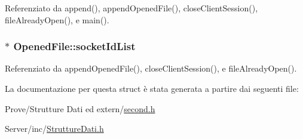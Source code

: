 Referenziato da append(), append\+Opened\+File(), close\+Client\+Session(), file\+Already\+Open(), e main().

\hypertarget{structOpenedFile_afae954d6877e7a6345a696d29355f29e}{}
\subsubsection[{socket\+Id\+List}]{$\ast$ Opened\+File\+::socket\+Id\+List}\label{structOpenedFile_afae954d6877e7a6345a696d29355f29e}


Referenziato da append\+Opened\+File(), close\+Client\+Session(), e file\+Already\+Open().



La documentazione per questa struct è stata generata a partire dai seguenti file\+:\begin{DoxyCompactItemize}
\item 
Prove/\+Strutture Dati ed extern/\hyperlink{second_8h}{second.\+h}\item 
Server/inc/\hyperlink{StruttureDati_8h}{Strutture\+Dati.\+h}\end{DoxyCompactItemize}
